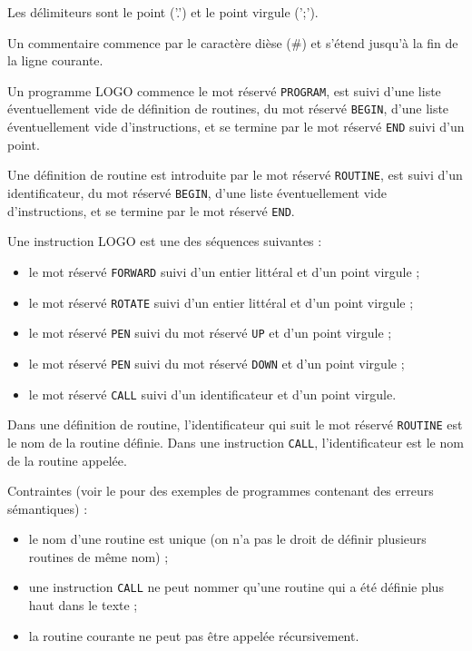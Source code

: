Les délimiteurs sont le point ('.') et le point virgule (';').

Un commentaire commence par le caractère dièse (\#) et s'étend jusqu'à la fin de la ligne courante.



Un programme LOGO commence le mot réservé \texttt{PROGRAM}, est suivi d'une liste éventuellement vide de définition de routines, du mot réservé \texttt{BEGIN}, d'une liste éventuellement vide d'instructions, et se termine par le mot réservé \texttt{END} suivi d'un point.

Une définition de routine est introduite par le mot réservé \texttt{ROUTINE}, est suivi d'un identificateur, du mot réservé \texttt{BEGIN}, d'une liste éventuellement vide d'instructions, et se termine par le mot réservé \texttt{END}.

Une instruction LOGO est une des séquences suivantes :
\begin{itemize}
  \item le mot réservé \texttt{FORWARD} suivi d'un entier littéral et d'un point virgule ;
  \item le mot réservé \texttt{ROTATE} suivi d'un entier littéral et d'un point virgule ;
  \item le mot réservé \texttt{PEN} suivi du mot réservé \texttt{UP} et d'un point virgule ;
  \item le mot réservé \texttt{PEN} suivi du mot réservé \texttt{DOWN} et d'un point virgule ;
  \item le mot réservé \texttt{CALL} suivi d'un identificateur et d'un point virgule.
\end{itemize}


Dans une définition de routine, l'identificateur qui suit le mot réservé \texttt{ROUTINE} est le nom de la routine définie. Dans une instruction \texttt{CALL}, l'identificateur est le nom de la routine appelée.

Contraintes (voir le  pour des exemples de programmes contenant des erreurs sémantiques) :
\begin{itemize}
  \item le nom d'une routine est unique (on n'a pas le droit de définir plusieurs routines de même nom) ;
  \item une instruction \texttt{CALL} ne peut nommer qu'une routine qui a été définie plus haut dans le texte ;
  \item la routine courante ne peut pas être appelée récursivement.
\end{itemize}

